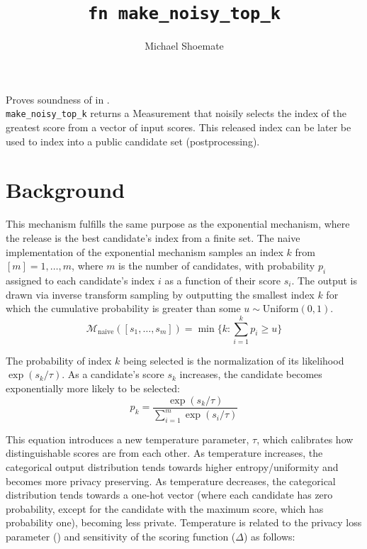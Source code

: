 \documentclass{article}
\title{\texttt{fn make\_noisy\_top\_k}}
\author{Michael Shoemate}
\begin{document}
  
\maketitle 
 
Proves soundness of   
in .\\ 
\texttt{make\_noisy\_top\_k} returns a Measurement that  
noisily selects the index of the greatest score from a vector of input scores. 
This released index can be later be used to index into a public candidate set (postprocessing). 
 
\section{Background}
This mechanism fulfills the same purpose as the exponential mechanism, 
where the release is the best candidate's index from a finite set.
The naive implementation of the exponential mechanism samples an index $k$ from $[m] = {1, \ldots, m}$, 
where $m$ is the number of candidates,
with probability $p_i$ assigned to each candidate's index $i$ as a function of their score $s_i$.
The output is drawn via inverse transform sampling
by outputting the smallest index $k$ for which the cumulative probability is greater than some $u \sim \mathrm{Uniform}(0, 1)$. 
\begin{equation}  
    \label{m-naive}  
    \mathcal{M}_{\mathrm{naive}}([s_1, \ldots, s_m]) = \min \{k: \sum_{i=1}^k p_i \ge u \}
\end{equation}
 
The probability of index $k$ being selected is the normalization of its likelihood $\exp(s_k / \tau)$. 
As a candidate's score $s_k$ increases, the candidate becomes exponentially more likely to be selected:
\begin{equation} 
    \label{prob-of-k} 
    p_k = \frac{\exp(s_k / \tau)}{\sum_{i = 1}^m \exp(s_i / \tau)} 
\end{equation} 
 
This equation introduces a new temperature parameter, $\tau$, 
which calibrates how distinguishable scores are from each other. 
As temperature increases, the categorical output distribution tends towards higher entropy/uniformity and becomes more privacy preserving. 
As temperature decreases, the categorical distribution tends towards a one-hot vector 
(where each candidate has zero probability, except for the candidate with the maximum score, which has probability one), 
becoming less private. 
Temperature is related to the privacy loss parameter (\dout) and sensitivity of the scoring function ($\Delta$) as follows: 
 
\end{document}
